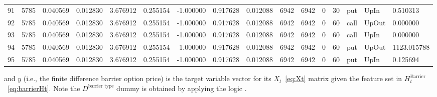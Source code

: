 \begin{table}[H]
{\begin{tabular}{llllllllllllllll}
			91 & 5785 & 0.040569 & 0.012830 & 3.676912 & 0.255154 & -1.000000 & 0.917628 & 0.012088 & 6942 & 6942 & 0 & 30 & put & UpIn & 0.510313 \\
			92 & 5785 & 0.040569 & 0.012830 & 3.676912 & 0.255154 & -1.000000 & 0.917628 & 0.012088 & 6942 & 6942 & 0 & 60 & call & UpOut & 0.000000 \\
			93 & 5785 & 0.040569 & 0.012830 & 3.676912 & 0.255154 & -1.000000 & 0.917628 & 0.012088 & 6942 & 6942 & 0 & 60 & call & UpIn & 0.000000 \\
			94 & 5785 & 0.040569 & 0.012830 & 3.676912 & 0.255154 & -1.000000 & 0.917628 & 0.012088 & 6942 & 6942 & 0 & 60 & put & UpOut & 1123.015788 \\
			95 & 5785 & 0.040569 & 0.012830 & 3.676912 & 0.255154 & -1.000000 & 0.917628 & 0.012088 & 6942 & 6942 & 0 & 60 & put & UpIn & 0.125694 \\
			\bottomrule
		\end{tabular}
	}
\end{table}
and $y$ (i.e., the finite difference barrier option price) is the target variable vector for its $X_{t}$~\eqref{eq:Xt} matrix given the feature set in $H_{t}^{\text{Barrier}}$~\eqref{eq:barrierHt}. Note the $D^{\text{barrier type}}$ dummy is obtained by applying the logic .
\newpage
